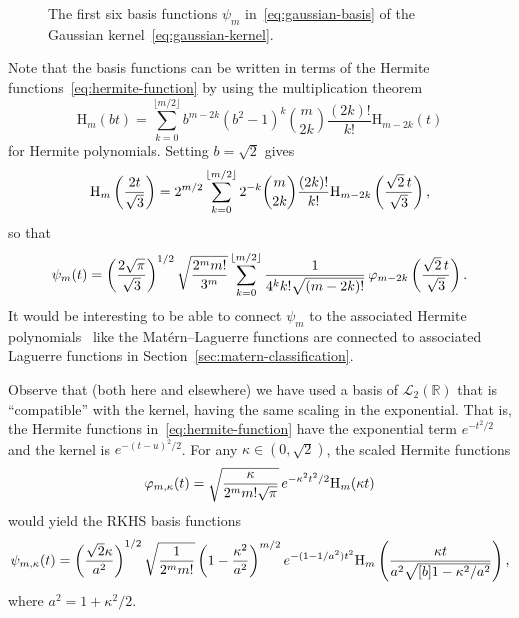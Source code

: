 \documentclass{article}
\newcommand{\R}{\mathbb{R}}
\begin{document}
\begin{figure}[h]
  \begin{center}
    \label{fig:gaussian-basis}
  \end{center}
  \caption{The first six basis functions $\psi_m$ in~\eqref{eq:gaussian-basis}
  of the Gaussian kernel~\eqref{eq:gaussian-kernel}.}
\end{figure}

Note that the basis functions can be written in terms of the Hermite
functions~\eqref{eq:hermite-function} by using the multiplication theorem
\[ \mathrm{H}_m (bt) = \sum_{k = 0}^{\lfloor m / 2 \rfloor} b^{m - 2 k}  (b^2
   - 1)^k \binom{m}{2 k} \frac{(2 k) !}{k!} \mathrm{H}_{m - 2 k} (t) \]
for Hermite polynomials. Setting $b = \sqrt{2}$ gives
\[ \mathrm{H}_m \left( \frac{2 t}{\sqrt{3}} \right) = 2^{m / 2}  \sum_{k =
   0}^{\lfloor m / 2 \rfloor} 2^{- k} \binom{m}{2 k} \frac{(2 k) !}{k!}
   \mathrm{H}_{m - 2 k} \left( \frac{\sqrt{2}  \hspace{0.17em} t}{\sqrt{3}}
   \right), \]
so that
\[ \psi_m (t) = \left( \frac{2 \sqrt{\pi}}{\sqrt{3}} \right)^{1 / 2}
   \sqrt{\frac{2^m m!}{3^m}}  \sum_{k = 0}^{\lfloor m / 2 \rfloor}
   \frac{1}{4^k k! \sqrt{(m - 2 k) !}}  \hspace{0.17em} \varphi_{m - 2 k}
   \left( \frac{\sqrt{2}  \hspace{0.17em} t}{\sqrt{3}} \right) . \]
It would be interesting to be able to connect $\psi_m$ to the associated
Hermite polynomials~{\cite{AskeyWimp1984}} like the Mat{\'e}rn--Laguerre
functions are connected to associated Laguerre functions in 
Section~\ref{sec:matern-classification}.

\begin{remark}
  Observe that (both here and elsewhere) we have used a basis of
  $\mathscr{L}_2 (\R)$ that is ``compatible'' with the kernel, having the same
  scaling in the exponential. That is, the Hermite functions
  in~\eqref{eq:hermite-function} have the exponential term $e^{- t^2 / 2}$ and
  the kernel is $e^{- (t - u)^2 / 2}$. For any $\kappa \in (0, \sqrt{2})$, the
  scaled Hermite functions
  \[ \varphi_{m, \kappa} (t) = \sqrt{\frac{\kappa}{2^m m! \sqrt{\pi}}} 
     \hspace{0.17em} e^{- \kappa^2 t^2 / 2} \mathrm{H}_m (\kappa t) \]
  would yield the RKHS basis functions
  \[ \psi_{m, \kappa} (t) = \left( \frac{\sqrt{2} \kappa}{a^2} \right)^{1 / 2}
     \sqrt{\frac{1}{2^m m!}}  \left( 1 - \frac{\kappa^2}{a^2} \right)^{m / 2}
     e^{- (1 - 1 / a^2) t^2} \mathrm{H}_m \left( \frac{\kappa t}{a^2 
     \sqrt{\smash{[} b] 1 - \kappa^2 / a^2}} \right), \]
  where $a^2 = 1 + \kappa^2 / 2$.
\end{remark}
\end{document}

